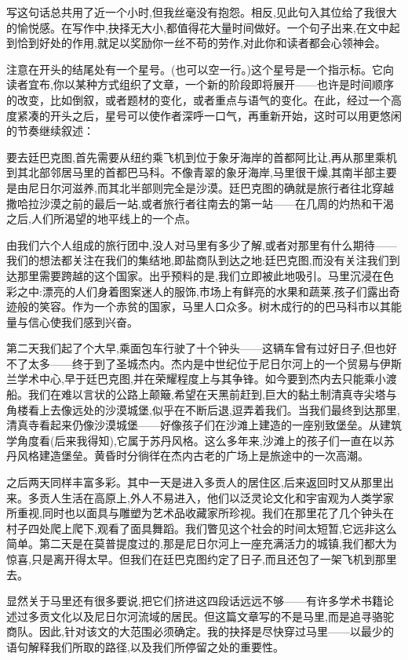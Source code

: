 写这句话总共用了近一个小时,但我丝毫没有抱怨。相反,见此句入其位给了我很大的愉悦感。在写作中,抉择无大小,都值得花大量时间做好。一个句子出来,在文中起到恰到好处的作用,就足以奖励你一丝不苟的劳作,对此你和读者都会心领神会。

注意在开头的结尾处有一个星号。(也可以空一行。)这个星号是一个指示标。它向读者宜布,你以某种方式组织了文章，一个新的阶段即将展开——也许是时间顺序的改变，比如倒叙，或者题材的变化，或者重点与语气的变化。在此，经过一个高度紧凑的开头之后，星号可以使作者深呼一口气，再重新开始，这时可以用更悠闲的节奏继续叙述：


要去廷巴克图,首先需要从纽约乘飞机到位于象牙海岸的首都阿比让,再从那里乘机到其北部邻居马里的首都巴马科。不像青翠的象牙海岸,马里很干燥,其南半部主要是由尼日尔河滋养,而其北半部则完全是沙漠。廷巴克图的确就是旅行者往北穿越撒哈拉沙漠之前的最后一站,或者旅行者往南去的第一站——在几周的灼热和干渴之后,人们所渴望的地平线上的一个点。

由我们六个人组成的旅行团中,没人对马里有多少了解,或者对那里有什么期待——我们的想法都关注在我们的集结地,即盐商队到达之地:廷巴克图,而没有关注我们到达那里需要跨越的这个国家。出乎预料的是,我们立即被此地吸引。马里沉浸在色彩之中:漂亮的人们身着图案迷人的服饰,市场上有鲜亮的水果和蔬莱,孩子们露出奇迹般的笑容。作为一个赤贫的国家，马里人口众多。树木成行的的巴马科市以其能量与信心使我们感到兴奋。

第二天我们起了个大早,乘面包车行驶了十个钟头——这辆车曾有过好日子,但也好不了太多——终于到了圣城杰内。杰内是中世纪位于尼日尔河上的一个贸易与伊斯兰学术中心,早于廷巴克图,并在荣耀程度上与其争锋。如今要到杰内去只能乘小渡船。我们在难以言状的公路上颠簸,希望在天黑前赶到,巨大的黏土制清真寺尖塔与角楼看上去像远处的沙漠城堡,似乎在不断后退,逗弄着我们。当我们最终到达那里,清真寺看起来仍像沙漠城堡——好像孩子们在沙滩上建造的一座别致堡垒。从建筑学角度看(后来我得知),它属于苏丹风格。这么多年来,沙滩上的孩子们一直在以苏丹风格建造堡垒。黄昏时分徜徉在杰内古老的广场上是旅途中的一次高潮。

之后两天同样丰富多彩。其中一天是进入多贡人的居住区,后来返回时又从那里出来。多贡人生活在高原上,外人不易进入，他们以泛灵论文化和宇宙观为人类学家所重视,同时也以面具与雕塑为艺术品收藏家所珍视。我们在那里花了几个钟头在村子四处爬上爬下,观看了面具舞蹈。我们瞥见这个社会的时间太短暂,它远非这么简单。第二天是在莫普提度过的,那是尼日尔河上一座充满活力的城镇,我们都大为惊喜,只是离开得太早。但我们在廷巴克图约定了日子,而且还包了一架飞机到那里去。

显然关于马里还有很多要说,把它们挤进这四段话远远不够——有许多学术书籍论述过多贡文化以及尼日尔河流域的居民。但这篇文章写的不是马里,而是追寻骆驼商队。因此,针对该文的大范围必须确定。我的抉择是尽快穿过马里——以最少的语句解释我们所取的路径,以及我们所停留之处的重要性。

